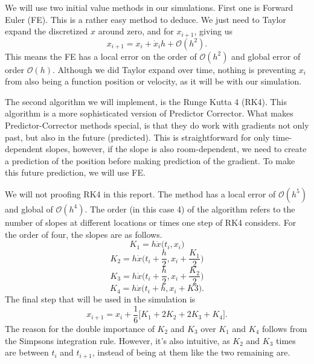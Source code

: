 \documentclass[english,notitlepage,reprint,nofootinbib]{revtex4-1}
\begin{document}
We will use two initial value methods in our simulations. First one is Forward Euler (FE). This is a rather easy method to deduce. We just need to Taylor expand the discretized $x$ around zero, and for $x_{i+1}$, giving us
\begin{equation}
    x_{i+1} = x_i + \dot{x}_i h  + \mathcal{O}(h^2).
\end{equation}
This means the FE has a local error on the order of $\mathcal{O}(h^2)$ and global error of order $\mathcal{O}(h)$. Although we did Taylor expand over time, nothing is preventing $x_i$ from also being a function position or velocity, as it will be with our simulation. 

The second algorithm we will implement, is the Runge Kutta 4 (RK4). This algorithm is a more sophisticated version of Predictor Corrector. What makes Predictor-Corrector methods special, is that they do work with gradients not only past, but also in the future (predicted). This is straightforward for only time-dependent slopes, however, if the slope is also room-dependent, we need to create a prediction of the position before making prediction of the gradient. To make this future prediction, we will use FE.

We will not proofing RK4 in this report. The method has a local error of $\mathcal{O}(h^5)$ and global of $\mathcal{O}(h^4)$. The order (in this case 4) of the algorithm refers to the number of slopes at different locations or times one step of RK4 considers. For the order of four, the slopes are as follows. 
$$ K_1 = h \dot{x}\Big(t_i,x_i \Big) $$
$$ K_2 = h \dot{x}\Big(t_i + \frac{h}{2},x_i + \frac{K_1}{2}\Big) $$
\begin{equation}
K_3 = h \dot{x}\Big(t_i + \frac{h}{2},x_i + \frac{K_2}{2}\Big)
\end{equation}
$$ K_4 = h \dot{x}\Big(t_i + h,x_i + K3 \Big) .$$
The final step that will be used in the simulation is
\begin{equation}
    x_{i+1} = x_i + \frac{1}{6} \Big[ K_1 + 2K_2 + 2K_3 + K_4 \Big].
\end{equation}
The reason for the double importance of $K_2$ and $K_3$ over $K_1$ and $K_4$ follows from the Simpsons integration rule. However, it's also intuitive, as $K_2$ and $K_3$ times are between $t_i$ and $t_{i+1}$, instead of being at them like the two remaining are.
\end{document}
